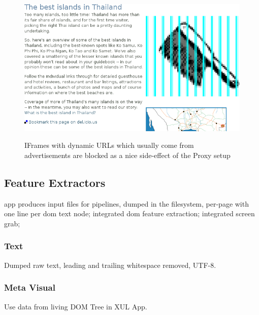 \begin{figure}
	{\includegraphics[width=\textwidth]{add}}
\caption{IFrames with dynamic URLs which usually come from advertisements are blocked as a nice side-effect of the Proxy setup}
\end{figure}

\subsection{Feature Extractors}

app produces input files for pipelines, dumped in the filesystem, per-page with one line per dom text node;
integrated dom feature extraction;
integrated screen grab;

\subsubsection{Text}

Dumped raw text, leading and trailing whitespace removed, UTF-8.

\subsubsection{Meta Visual}

Use data from living DOM Tree in XUL App.

